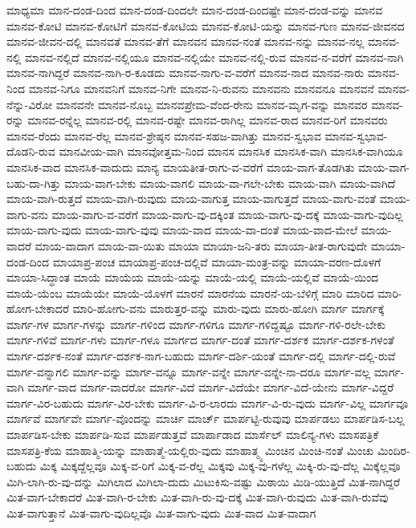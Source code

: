 {ಮಾಧ್ಯಮಾ
ಮಾನ-ದಂಡ-ದಿಂದ
ಮಾನ-ದಂಡ-ದಿಂದಲೇ
ಮಾನ-ದಂಡ-ದಿಂದಷ್ಟೇ
ಮಾನ-ದಂಡ-ವನ್ನು
ಮಾನವ
ಮಾನವ-ಕೋಟಿ
ಮಾನವ-ಕೋಟಿಗೆ
ಮಾನವ-ಕೋಟಿಯ
ಮಾನವ-ಕೋಟಿ-ಯನ್ನು
ಮಾನವ-ಗುಣ
ಮಾನವ-ಜೀವನದ
ಮಾನವ-ಜೀವನ-ದಲ್ಲಿ
ಮಾನವತೆ
ಮಾನವ-ತೆಗೆ
ಮಾನವನ
ಮಾನವ-ನಂತೆ
ಮಾನವ-ನನ್ನು
ಮಾನವ-ನಲ್ಲ
ಮಾನವ-ನಲ್ಲಿ
ಮಾನವ-ನಲ್ಲಿದೆ
ಮಾನವ-ನಲ್ಲಿಯೂ
ಮಾನವ-ನಲ್ಲಿಯೇ
ಮಾನವ-ನಲ್ಲಿ-ರುವ
ಮಾನವ-ನ-ವರೆಗೆ
ಮಾನವ-ನಾಗಿ
ಮಾನವ-ನಾಗಿದ್ದರೆ
ಮಾನವ-ನಾಗಿ-ರ-ಕೂಡದು
ಮಾನವ-ನಾಗು-ವ-ವರೆಗೆ
ಮಾನವ-ನಾದ
ಮಾನವ-ನಾರು
ಮಾನವ-ನಿಂದ
ಮಾನವ-ನಿಗೂ
ಮಾನವನಿಗೆ
ಮಾನವ-ನಿಗೇ
ಮಾನವ-ನಿ-ರುವನು
ಮಾನವನು
ಮಾನವನೂ
ಮಾನವನೆ
ಮಾನವ-ನೆನ್ನು-ವಿರೋ
ಮಾನವನೇ
ಮಾನವ-ನೊಬ್ಬ
ಮಾನವಪ್ರೇಮ-ವೆಂದ-ರೇನು
ಮಾನವ-ಮೃಗ-ವನ್ನು
ಮಾನವರ
ಮಾನವ-ರನ್ನು
ಮಾನವ-ರನ್ನೆಲ್ಲ
ಮಾನವ-ರಲ್ಲಿ
ಮಾನವ-ರಷ್ಟೇ
ಮಾನವ-ರಾಗಿಲ್ಲ
ಮಾನವ-ರಾದ
ಮಾನವ-ರಿಗೆ
ಮಾನವರು
ಮಾನವ-ರೆಂದು
ಮಾನವ-ರೆಲ್ಲ
ಮಾನವ-ಶ್ರೇಷ್ಠನ
ಮಾನವ-ಸಹಜ-ವಾಗಿತ್ತು
ಮಾನವ-ಸ್ವಭಾವ
ಮಾನವ-ಸ್ವಭಾವ-ದೊಡನಿ-ರುವ
ಮಾನವೀಯ-ವಾಗಿ
ಮಾನವೋತ್ತಮ-ನಿಂದ
ಮಾನಸ
ಮಾನಸಿಕ
ಮಾನಸಿಕ-ವಾಗಿ
ಮಾನಸಿಕ-ವಾಗಿಯೂ
ಮಾನಸಿಕ-ವಾದ
ಮಾನಸಿಕ-ವಾದುದು
ಮಾನ್ಯ
ಮಾಯತೀತ-ರಾಗು-ವ-ವರೆಗೆ
ಮಾಯ-ವಾಗ-ತೊಡಗಿತು
ಮಾಯ-ವಾಗ-ಬಹು-ದಾ-ಗಿತ್ತು
ಮಾಯ-ವಾಗ-ಬೇಕು
ಮಾಯ-ವಾಗಲಿ
ಮಾಯ-ವಾ-ಗಲೇ-ಬೇಕು
ಮಾಯ-ವಾಗಿ
ಮಾಯ-ವಾಗಿದೆ
ಮಾಯ-ವಾಗಿ-ರುತ್ತದೆ
ಮಾಯ-ವಾಗಿ-ರುವುದು
ಮಾಯ-ವಾಗುತ್ತ
ಮಾಯ-ವಾಗುತ್ತದೆ
ಮಾಯ-ವಾಗು-ವಂತೆ
ಮಾಯ-ವಾಗು-ವನು
ಮಾಯ-ವಾಗು-ವ-ವರೆಗೆ
ಮಾಯ-ವಾಗು-ವು-ದಕ್ಕಿಂತ
ಮಾಯ-ವಾಗು-ವು-ದಕ್ಕೆ
ಮಾಯ-ವಾಗು-ವುದಿಲ್ಲ
ಮಾಯ-ವಾಗು-ವುದು
ಮಾಯ-ವಾಗು-ವುವು
ಮಾಯ-ವಾದ
ಮಾಯ-ವಾ-ದಂತೆ
ಮಾಯ-ವಾದ-ಮೇಲೆ
ಮಾಯ-ವಾದರೆ
ಮಾಯ-ವಾದಾಗ
ಮಾಯ-ವಾ-ಯಿತು
ಮಾಯಾ
ಮಾಯಾ-ಜನಿ-ತರು
ಮಾಯಾ-ತೀತ-ರಾಗುವುದೇ
ಮಾಯಾ-ದಂಡ-ದಿಂದ
ಮಾಯಾಪ್ರ-ಪಂಚ
ಮಾಯಾಪ್ರ-ಪಂಚ-ದಲ್ಲಿವೆ
ಮಾಯಾ-ಮಂತ್ರ-ವನ್ನು
ಮಾಯಾ-ವರಣ-ದೊಳಗೆ
ಮಾಯಾ-ಸಿದ್ಧಾಂತ
ಮಾಯೆ
ಮಾಯೆಯ
ಮಾಯೆ-ಯನ್ನು
ಮಾಯೆ-ಯಲ್ಲಿ
ಮಾಯೆ-ಯಲ್ಲಿವೆ
ಮಾಯೆ-ಯಿಂದ
ಮಾಯೆ-ಯೆಂಬ
ಮಾಯೆಯೇ
ಮಾಯೆ-ಯೊಳಗೆ
ಮಾರನೆ
ಮಾರನೆಯ
ಮಾರನೆ-ಯ-ಬೆಳಿಗ್ಗೆ
ಮಾರಿ
ಮಾರಿದ
ಮಾರಿ-ಹೋಗ-ಬೇಕಾದರೆ
ಮಾರಿ-ಹೋಗು-ವನು
ಮಾರುತ್ತರ-ವನ್ನು
ಮಾರು-ವುದು
ಮಾರು-ಹೋಗಿ
ಮಾರ್ಗ
ಮಾರ್ಗಕ್ಕೆ
ಮಾರ್ಗ-ಗಳ
ಮಾರ್ಗ-ಗಳನ್ನು
ಮಾರ್ಗ-ಗಳಿಂದ
ಮಾರ್ಗ-ಗಳಿಗೂ
ಮಾರ್ಗ-ಗಳಿದ್ದಷ್ಟೂ
ಮಾರ್ಗ-ಗಳಿ-ರಲೇ-ಬೇಕು
ಮಾರ್ಗ-ಗಳಿವೆ
ಮಾರ್ಗ-ಗಳು
ಮಾರ್ಗ-ಗಳೂ
ಮಾರ್ಗದ
ಮಾರ್ಗ-ದಂತೆ
ಮಾರ್ಗ-ದರ್ಶಕ
ಮಾರ್ಗ-ದರ್ಶಕ-ಗಳಂತೆ
ಮಾರ್ಗ-ದರ್ಶಕ-ನಂತೆ
ಮಾರ್ಗ-ದರ್ಶಕ-ನಾಗ-ಬಹುದು
ಮಾರ್ಗ-ದರ್ಶಿ-ಯಂತೆ
ಮಾರ್ಗ-ದಲ್ಲಿ
ಮಾರ್ಗ-ದಲ್ಲಿ-ರುವೆ
ಮಾರ್ಗ-ವನ್ನಾಗಲಿ
ಮಾರ್ಗ-ವನ್ನು
ಮಾರ್ಗ-ವನ್ನೂ
ಮಾರ್ಗ-ವನ್ನೇ
ಮಾರ್ಗ-ವನ್ನೇ-ನಾ-ದರೂ
ಮಾರ್ಗ-ವಲ್ಲ
ಮಾರ್ಗ-ವಾಗಿ
ಮಾರ್ಗ-ವಾದ
ಮಾರ್ಗ-ವಾದರೋ
ಮಾರ್ಗ-ವಿದೆ
ಮಾರ್ಗ-ವಿದೆಯೇ
ಮಾರ್ಗ-ವಿದೆ-ಯೇನು
ಮಾರ್ಗ-ವಿದ್ದರೆ
ಮಾರ್ಗ-ವಿರ-ಬಹುದು
ಮಾರ್ಗ-ವಿರ-ಬೇಕು
ಮಾರ್ಗ-ವಿ-ರ-ಲಾರದು
ಮಾರ್ಗ-ವಿ-ರು-ವುದು
ಮಾರ್ಗ-ವಿಲ್ಲ
ಮಾರ್ಗವೂ
ಮಾರ್ಗವೆ
ಮಾರ್ಗವೇ
ಮಾರ್ಗ-ವೊಂದನ್ನು
ಮಾರ್ಚಿ
ಮಾರ್ಚ್
ಮಾರ್ಪಟ್ಟಿ-ರುವುವು
ಮಾರ್ಪಡಲು
ಮಾರ್ಪಡಿಸ-ಬಲ್ಲ
ಮಾರ್ಪಡಿಸ-ಬೇಕು
ಮಾರ್ಪಡಿ-ಸುವ
ಮಾರ್ಪಡುತ್ತವೆ
ಮಾರ್ಪಾಡಾದ
ಮಾರ್ಸೆಲ್
ಮಾಲಿನ್ಯ-ಗಳು
ಮಾಸಪತ್ರಿಕೆ
ಮಾಸಪತ್ರಿ-ಕೆಯ
ಮಾಹಾತ್ಮಿ-ಯನ್ನು
ಮಾಹಾತ್ಮೆ-ಯಲ್ಲಿರು-ವುದು
ಮಾಹಾತ್ಮ್ಯ
ಮಿಂಚಿನ
ಮಿಂಚಿ-ನಂತೆ
ಮಿಂಚು
ಮಿಂದಿರ-ಬಹುದು
ಮಿಕ್ಕ
ಮಿಕ್ಕದ್ದೆಲ್ಲವೂ
ಮಿಕ್ಕ-ವ-ರಿಗೆ
ಮಿಕ್ಕ-ವ-ರೆಲ್ಲ
ಮಿಕ್ಕವು
ಮಿಕ್ಕ-ವು-ಗಳೆಲ್ಲ
ಮಿಕ್ಕಿ-ರು-ವು-ದೆಲ್ಲ
ಮಿಕ್ಕೆಲ್ಲವೂ
ಮಿಗಿ-ಲಾಗಿ-ರು-ವು-ದನ್ನು
ಮಿಗಿಲಾದ
ಮಿಗಿಲಾ-ದುದು
ಮಿಟುಕಿಸು-ವಷ್ಟು
ಮಿಠಾಯಿ
ಮಿಡಿ-ಯುತ್ತಿದೆ
ಮಿತ-ನಾಗಿದ್ದರೆ
ಮಿತ-ವಾಗ-ಬೇಕಾದರೆ
ಮಿತ-ವಾಗಿ-ರ-ಬೇಕು
ಮಿತ-ವಾಗಿ-ರು-ವು-ದಕ್ಕೆ
ಮಿತ-ವಾಗಿ-ರುವುದು
ಮಿತ-ವಾಗಿ-ರುವೆವು
ಮಿತ-ವಾಗುತ್ತಾನೆ
ಮಿತ-ವಾಗು-ವುದಿಲ್ಲವೊ
ಮಿತ-ವಾಗು-ವುದು
ಮಿತ-ವಾದ
ಮಿತ-ವಾದಾಗ
}
